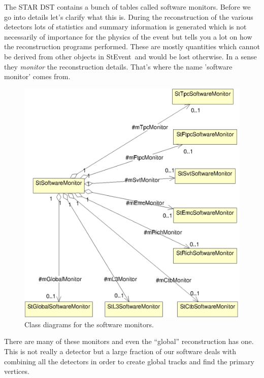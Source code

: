 \documentclass[twoside]{article}
\newcommand{\StEvent}{\textsf{StEvent}}
\begin{document}
The STAR DST contains a bunch of tables called software monitors.
Before we go into details let's clarify what this is. During the
reconstruction of the various detectors lots of statistics and summary
information is generated which is not necessarily of importance for
the physics of the event but tells you a lot on how the reconstruction
programs performed. These are mostly quantities which cannot be
derived from other objects in \StEvent\ and would be lost otherwise.
In a sense they \emph{monitor} the reconstruction details.
That's where the name 'software monitor' comes from.\\
\begin{figure}[hbt]
    \begin{center}
        \includegraphics{monitors.eps}
        \caption{Class diagrams for the software monitors.}
        \label{fig:umlMonitors}
    \end{center}
\end{figure}

There are many of these monitors and even the ``global''
reconstruction has one. This is not really a detector but a large
fraction of our software deals with combining all the detectors in
order to create global tracks and find the primary vertices.
\end{document}
